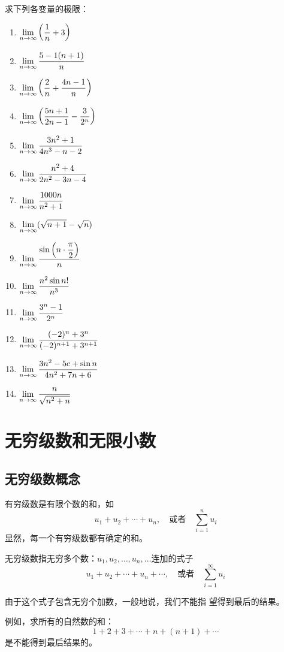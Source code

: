 求下列各变量的极限：
\begin{multicols}{2}
\begin{enumerate}
\item $\displaystyle\lim_{n\to\infty}\left(\dfrac{1}{n}+3\right)$
\item  $\displaystyle\lim_{n\to\infty} \dfrac{5-1(n+1)}{n}$ 
\item  $\displaystyle\lim_{n\to\infty}\left(\dfrac{2}{n}+\dfrac{4 n-1}{n}\right)$
\item  $\displaystyle\lim_{n\to\infty}\left(\dfrac{5 n+1}{2 n-1}-\dfrac{3}{2^{n}}\right)$
\item $\displaystyle\lim_{n\to\infty} \dfrac{3 n^{2}+1}{4 n^{3}-n-2} $
\item $\displaystyle\lim_{n\to\infty} \dfrac{n^{2}+4}{2 n^{2}-3 n-4}$
\item $ \displaystyle\lim_{n\to\infty} \dfrac{1000 n}{n^{2}+1}$
\item  $\displaystyle\lim_{n\to\infty}(\sqrt{n+1}-\sqrt{n})$
\item  $\displaystyle\lim_{n\to\infty} \dfrac{\sin \left(n \cdot \dfrac{\pi}{2}\right)}{n}$
\item  $\displaystyle\lim_{n\to\infty} \dfrac{n^{2} \sin n !}{n^{3}}$
\item  $\displaystyle\lim_{n\to\infty} \dfrac{3^{n}-1}{2^{n}}$
\item  $\displaystyle\lim_{n\to\infty} \dfrac{(-2)^{n}+3^{n}}{(-2)^{n+1}+3^{n+1}}$ 
\item  $\displaystyle\lim_{n\to\infty} \dfrac{3n^2-5c+\sin n}{4n^2+7n+6}$ 
\item  $\displaystyle\lim_{n\to\infty} \dfrac{n}{\sqrt{n^2+n}}$ 
\end{enumerate}    
\end{multicols}

\section{无穷级数和无限小数}
\subsection{无穷级数概念}

有穷级数是有限个数的和，如
$$u_1+u_2+\cdots+u_n,\quad \text{或者}\quad \sum^n_{i=1}u_i$$
显然，每一个有穷级数都有确定的和。

无穷级数指无穷多个数：$u_1,u_2,\ldots,u_n,\ldots$连加的式子
$$u_1+u_2+\cdots+u_n+\cdots,\quad \text{或者}\quad \sum^{\infty}_{i=1}u_i$$

由于这个式子包含无穷个加数，一般地说，我们不能指
望得到最后的结果。

例如，求所有的自然数的和：
\[1+2+3+\cdots+n+(n+1)+\cdots\]
是不能得到最后结果的。


